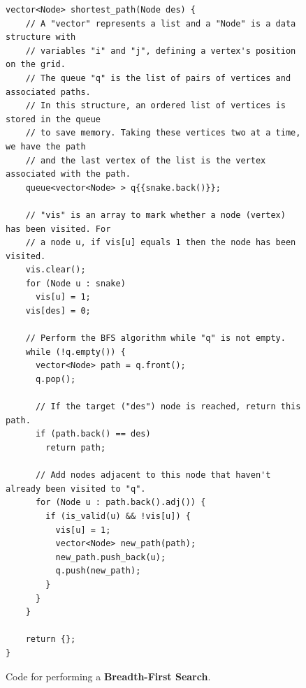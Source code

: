 \documentclass[12pt]{article}
\begin{document}
\begin{figure}[!h]
\centering
\begin{lstlisting}
vector<Node> shortest_path(Node des) {
	// A "vector" represents a list and a "Node" is a data structure with
	// variables "i" and "j", defining a vertex's position on the grid.
	// The queue "q" is the list of pairs of vertices and associated paths.
	// In this structure, an ordered list of vertices is stored in the queue
	// to save memory. Taking these vertices two at a time, we have the path
	// and the last vertex of the list is the vertex associated with the path.
    queue<vector<Node> > q{{snake.back()}};
    
    // "vis" is an array to mark whether a node (vertex) has been visited. For
    // a node u, if vis[u] equals 1 then the node has been visited.
    vis.clear();
    for (Node u : snake)
      vis[u] = 1;
    vis[des] = 0;
    
    // Perform the BFS algorithm while "q" is not empty.
    while (!q.empty()) {
      vector<Node> path = q.front();
      q.pop();
     
      // If the target ("des") node is reached, return this path.
      if (path.back() == des)
        return path;
        
      // Add nodes adjacent to this node that haven't already been visited to "q".
      for (Node u : path.back().adj()) {
        if (is_valid(u) && !vis[u]) {
          vis[u] = 1;
          vector<Node> new_path(path);
          new_path.push_back(u);
          q.push(new_path);
        }
      }
    }

    return {};
}
\end{lstlisting}
\caption{Code for performing a \textbf{Breadth-First Search}.}
\label{fig:bfs_code}
\end{figure}
\end{document}

